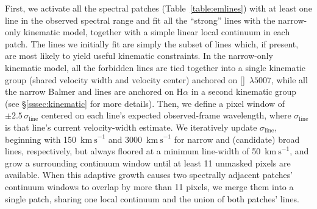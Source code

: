 \documentclass[modern,linenumbers]{aastex701}
\newcommand{\fastspecfit}{\texttt{FastSpecFit}}
\newcommand{\kms}{\ensuremath{\mathrm{km~s}^{-1}}}
\newcommand{\nii}{[\ion{N}{2}]}
\newcommand{\sii}{[\ion{S}{2}]}
\newcommand{\hei}{\ion{He}{1}}
\newcommand{\ha}{H\ensuremath{\alpha}}
\newcommand{\hb}{H\ensuremath{\beta}}
\newcommand{\oiiilam}{[\ion{O}{3}]~$\lambda5007$}
\newcommand{\oiiidoublet}{[\ion{O}{3}]~$\lambda\lambda4959,5007$}
\newcommand{\niidoublet}{[\ion{N}{2}]~$\lambda\lambda6548,84$}
\begin{document}


First, we activate all the spectral patches
(Table~\ref{table:emlines}) with at least one line in the observed
spectral range and fit all the ``strong'' lines with the narrow-only
kinematic model, together with a simple linear local continuum in each
patch. The lines we initially fit are simply the subset of lines
which, if present, are most likely to yield useful kinematic
constraints. In the narrow-only kinematic model, all the forbidden
lines are tied together into a single kinematic group (shared velocity
width and velocity center) anchored on \oiiilam, while all the narrow
Balmer and \hei{} lines are anchored on \ha{} in a second
kinematic group (see \S\ref{sssec:kinematic} for more details). Then,
we define a pixel window of $\pm2.5\,\sigma_\mathrm{line}$ centered on
each line's expected observed-frame wavelength, where
$\sigma_\mathrm{line}$ is that line's current velocity-width
estimate. We iteratively update $\sigma_\mathrm{line}$, beginning with
150~\kms{} and 3000~\kms{} for narrow and (candidate) broad lines,
respectively, but always floored at a minimum line-width of 50~\kms,
and grow a surrounding continuum window until at least 11 unmasked
pixels are available. When this adaptive growth causes two spectrally
adjacent patches' continuum windows to overlap by more than 11 pixels,
we merge them into a single patch, sharing one local continuum and the
union of both patches' lines.



\end{document}

